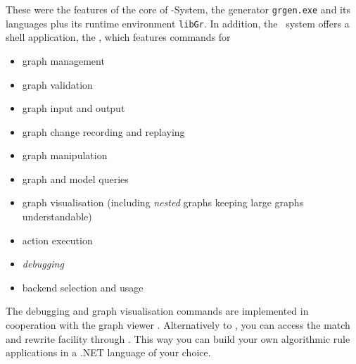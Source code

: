 \noindent These were the features of the core of \GrG-System,
the generator \texttt{grgen.exe} and its languages plus its runtime environment \texttt{libGr}.
In addition, the \GrG\ system offers a shell application, the \GrShell,
which features commands for
\begin{itemize}
	\item graph management
	\item graph validation
	\item graph input and output
	\item graph change recording and replaying
	\item graph manipulation
	\item graph and model queries
	\item graph visualisation (including \emph{nested} graphs keeping large graphs understandable)
	\item action execution
	\item \emph{debugging}
	\item backend selection and usage
\end{itemize}

\noindent The debugging and graph visualisation commands are implemented in cooperation with the graph viewer \yComp.
Alternatively to \GrShell, you can access the match and rewrite facility through \LibGr.
This way you can build your own algorithmic rule applications in a .NET language of your choice.

\pagebreak


